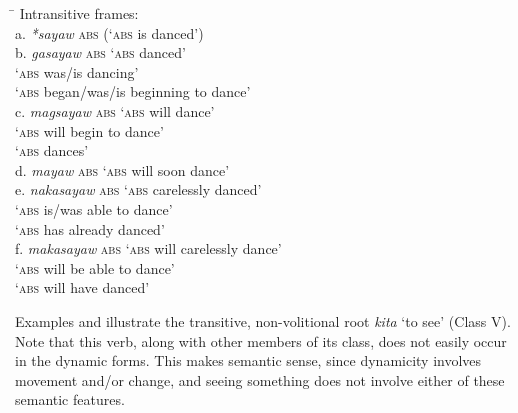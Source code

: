 \ea
\label{bkm:Ref148518761}
\begin{tabbing}
\hspace{4.5cm} \= \kill
Intransitive frames: \\
a.  \textit{*sayaw} \textsc{abs}  \>  (‘\textsc{abs} is danced’) \\
b.  \textit{gasayaw} \textsc{abs} \> ‘\textsc{abs} danced’ \\
\>      ‘\textsc{abs} was/is dancing’ \\
\>       ‘\textsc{abs} began/was/is beginning to dance’ \\
c.  \textit{magsayaw} \textsc{abs} \> ‘\textsc{abs} will dance’ \\
\>       ‘\textsc{abs} will begin to dance’ \\
\>      ‘\textsc{abs} dances’ \\
d.  \textit{mayaw} \textsc{abs}  \>  ‘\textsc{abs} will soon dance’\footnotemark{} \\
e.  \textit{nakasayaw} \textsc{abs} \> ‘\textsc{abs} carelessly danced’ \\
\>      ‘\textsc{abs} is/was able to dance’ \\
\>      ‘\textsc{abs} has already danced’ \\
f.  \textit{makasayaw} \textsc{abs} \> ‘\textsc{abs} will carelessly dance’ \\
\>      ‘\textsc{abs} will be able to dance’ \\
\>      ‘\textsc{abs} will have danced’ 
\end{tabbing}
\z

Examples  and  illustrate the transitive, non-volitional root \textit{kita} ‘to see’ (Class V). Note that this verb, along with other members of its class, does not easily occur in the dynamic forms. This makes semantic sense, since dynamicity involves movement and/or change, and seeing something does not involve either of these semantic features.

